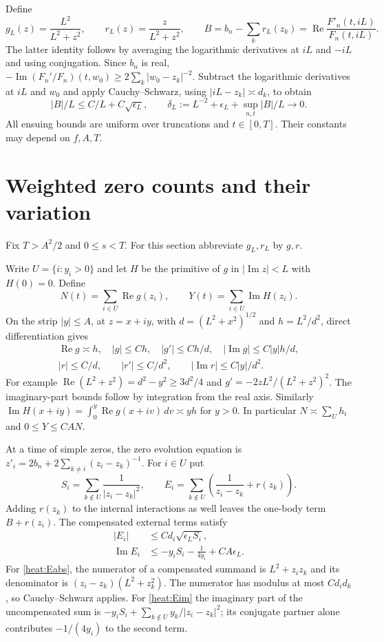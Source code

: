 \documentclass[11pt,a4paper]{article}
\numberwithin{equation}{section}
\renewcommand{\Re}{\operatorname{Re}}\renewcommand{\Im}{\operatorname{Im}}
\begin{document}
Define
\[
 g_L(z)=\frac{L^2}{L^2+z^2},\qquad r_L(z)=\frac z{L^2+z^2},\qquad
 B=b_n-\sum_k r_L(z_k)=\Re\frac{F'_n(t,iL)}{F_n(t,iL)} .
\]
The latter identity follows by averaging the logarithmic derivatives at $iL$ and $-iL$ and using conjugation. Since $b_n$ is real,
$-\Im(F_n'/F_n)(t,w_0)\ge2\sum_k|w_0-z_k|^{-2}$.
Subtract the logarithmic derivatives at $iL$ and $w_0$ and apply
Cauchy--Schwarz, using $|iL-z_k|\asymp d_k$, to obtain
\[
 |B|/L\le C/L+C\sqrt{\epsilon_L},\qquad
 \delta_L:=L^{-2}+\epsilon_L+\sup_{n,t}|B|/L\longrightarrow0 .
\]
All ensuing bounds are uniform over truncations and $t\in[0,T]$.
Their constants may depend on $f,A,T$.
\section{Weighted zero counts and their variation}\label{sec:balance}
Fix $T>A^2/2$ and $0\le s<T$. For this section abbreviate $g_L,r_L$ by $g,r$.

Write $U=\{i:y_i>0\}$ and let $H$ be the primitive of $g$ in
$|\Im z|<L$ with $H(0)=0$. Define
\[
 N(t)=\sum_{i\in U}\Re g(z_i),\qquad
 Y(t)=\sum_{i\in U}\Im H(z_i).
\]
On the strip $|y|\le A$, at $z=x+iy$, with
$d=(L^2+x^2)^{1/2}$ and $h=L^2/d^2$, direct differentiation gives
\[
\begin{gathered}
 \Re g\asymp h,\quad |g|\le C h,\quad
 |g'|\le C h/d,\quad |\Im g|\le C |y|h/d,\\
 |r|\le C/d,\qquad |r'|\le C/d^2,\qquad |\Im r|\le C|y|/d^2 .
\end{gathered}
\]
For example $\Re(L^2+z^2)=d^2-y^2\ge3d^2/4$ and
$g'=-2zL^2/(L^2+z^2)^2$. The imaginary-part bounds follow by
integration from the real axis. Similarly
$\Im H(x+iy)=\int_0^y\Re g(x+iv)\,dv\asymp yh$ for $y>0$.
In particular $N\asymp\sum_U h_i$ and $0\le Y\le CA N$.

At a time of simple zeros, the zero evolution equation is
$z'_i=2b_n+2\sum_{k\ne i}(z_i-z_k)^{-1}$. For $i\in U$ put
\[
 S_i=\sum_{k\notin U}\frac1{|z_i-z_k|^2},\qquad
 E_i=\sum_{k\notin U}\left(\frac1{z_i-z_k}+r(z_k)\right).
\]
Adding $r(z_k)$ to the internal interactions as well leaves the
one-body term $B+r(z_i)$. The compensated external terms satisfy
\begin{align}
 |E_i|&\le C d_i\sqrt{\epsilon_L S_i},\label{heat:Eabs}\\
 \Im E_i
 &\le -y_i S_i-\frac1{4y_i}+CA\epsilon_L.\label{heat:Eim}
\end{align}
For \eqref{heat:Eabs}, the numerator of a compensated summand is
$L^2+z_i z_k$ and its denominator is
$(z_i-z_k)(L^2+z_k^2)$. The numerator has modulus at most
$C d_i d_k$, so Cauchy--Schwarz applies. For \eqref{heat:Eim}
the imaginary part of the uncompensated sum is
$-y_i S_i+\sum_{k\notin U} y_k/|z_i-z_k|^2$; its conjugate
partner alone contributes $-1/(4y_i)$ to the second term.
\end{document}
